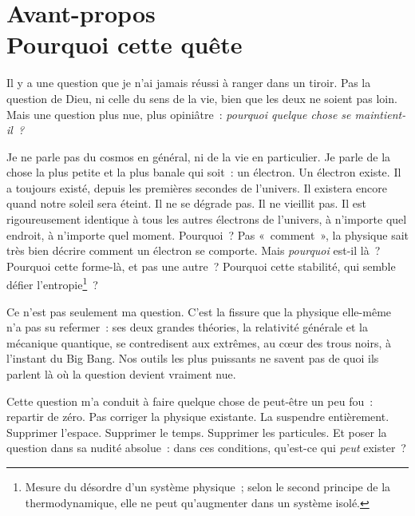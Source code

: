 \documentclass[12pt, a4paper, openright]{book}
\begin{document}
\mainmatter

\chapter*{Avant-propos \\ Pourquoi cette quête}

Il y a une question que je n'ai jamais réussi à ranger dans un tiroir. Pas la question de Dieu, ni celle du sens de la vie, bien que les deux ne soient pas loin. Mais une question plus nue, plus opiniâtre~: \emph{pourquoi quelque chose se maintient-il~?}

\medskip

Je ne parle pas du cosmos en général, ni de la vie en particulier. Je parle de la chose la plus petite et la plus banale qui soit~: un électron. Un électron existe. Il a toujours existé, depuis les premières secondes de l'univers. Il existera encore quand notre soleil sera éteint. Il ne se dégrade pas. Il ne vieillit pas. Il est rigoureusement identique à tous les autres électrons de l'univers, à n'importe quel endroit, à n'importe quel moment. Pourquoi~? Pas «~comment~», la physique sait très bien décrire comment un électron se comporte. Mais \emph{pourquoi} est-il là~? Pourquoi cette forme-là, et pas une autre~? Pourquoi cette stabilité, qui semble défier l'entropie\footnote{Mesure du désordre d'un système physique~; selon le second principe de la thermodynamique, elle ne peut qu'augmenter dans un système isolé.}~?

\medskip

Ce n'est pas seulement ma question. C'est la fissure que la physique elle-même n'a pas su refermer~: ses deux grandes théories, la relativité générale et la mécanique quantique, se contredisent aux extrêmes, au cœur des trous noirs, à l'instant du Big Bang. Nos outils les plus puissants ne savent pas de quoi ils parlent là où la question devient vraiment nue.

\medskip

Cette question m'a conduit à faire quelque chose de peut-être un peu fou~: repartir de zéro. Pas corriger la physique existante. La suspendre entièrement. Supprimer l'espace. Supprimer le temps. Supprimer les particules. Et poser la question dans sa nudité absolue~: dans ces conditions, qu'est-ce qui \emph{peut} exister~?
\end{document}
